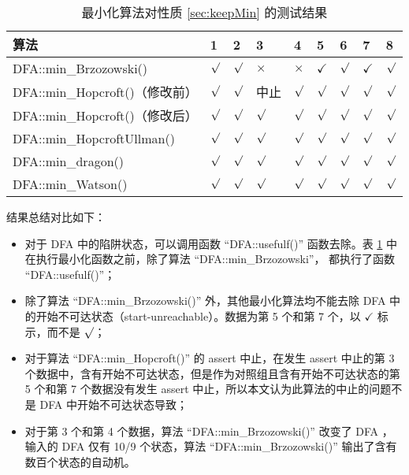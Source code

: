 \begin{table}[!htbp]
    \caption{ 最小化算法对性质 \ref{sec:keepMin} 的测试结果 }
    \label{tab:KeepMinResult}
    \centering
    \small%
    \setlength{\tabcolsep}{4pt}%
    \renewcommand{\arraystretch}{1.2}%
    \begin{tabular}{l|p{2em}<{\centering} p{2em}<{\centering} p{2em}<{\centering} p{2em}<{\centering} p{2em}<{\centering} p{2em}<{\centering} p{2em}<{\centering} p{2em}<{\centering}}  %
        \toprule %
        算法 & 1 & 2 & 3 & 4 &  5 &  6  & 7 & 8  \\
        \midrule
        DFA::min\_Brzozowski()        & $\surd$ & $\surd$ & $\times$  & $\times$  & $\checkmark$ & $\surd$ & $\checkmark$ & $\surd$ \\
        DFA::min\_Hopcroft()（修改前） & $\surd$ & $\surd$ & 中止    & $\surd$     & $\surd$ & $\surd$ & $\surd$ & $\surd$ \\
        DFA::min\_Hopcroft()（修改后） & $\surd$ & $\surd$ & $\surd$ & $\surd$     & $\surd$ & $\surd$ & $\surd$ & $\surd$ \\
        DFA::min\_HopcroftUllman()    & $\surd$ & $\surd$ & $\surd$ & $\surd$     & $\surd$ & $\surd$ & $\surd$ & $\surd$ \\
        DFA::min\_dragon()            & $\surd$ & $\surd$ & $\surd$ & $\surd$     & $\surd$ & $\surd$ & $\surd$ & $\surd$ \\
        DFA::min\_Watson()            & $\surd$ & $\surd$ & $\surd$ & $\surd$     & $\surd$ & $\surd$ & $\surd$ & $\surd$ \\
        \bottomrule%
    \end{tabular}
\end{table}


结果总结对比如下：
\begin{itemize}
    \item 对于 DFA 中的陷阱状态，可以调用函数 “DFA::usefulf()” 函数去除。表 \ref{tab:KeepMinResult} 中在执行最小化函数之前，除了算法 “DFA::min\_Brzozowski”， 都执行了函数 “DFA::usefulf()”；
    \item 除了算法 “DFA::min\_Brzozowski()” 外，其他最小化算法均不能去除 DFA 中的开始不可达状态（start-unreachable）。数据为第 5 个和第 7 个，以 $\checkmark$ 标示，而不是 $\surd$；
    \item 对于算法 “DFA::min\_Hopcroft()” 的 assert 中止，在发生 assert 中止的第 3 个数据中，含有开始不可达状态，但是作为对照组且含有开始不可达状态的第 5 个和第 7 个数据没有发生 assert 中止，所以本文认为此算法的中止的问题不是 DFA 中开始不可达状态导致；
    \item 对于第 3 个和第 4 个数据，算法 “DFA::min\_Brzozowski()” 改变了 DFA ，输入的 DFA 仅有 10/9 个状态，算法 “DFA::min\_Brzozowski()” 输出了含有数百个状态的自动机。
\end{itemize}



